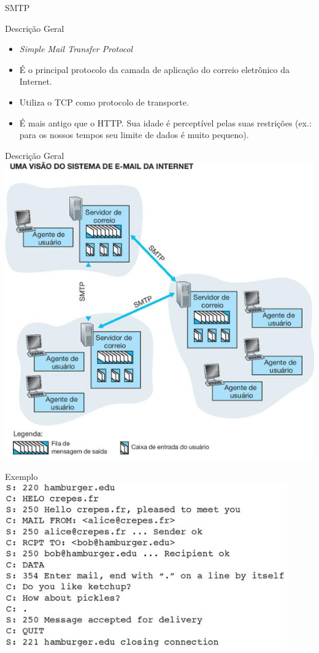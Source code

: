 \documentclass{libs/ufc_format}
\begin{document}
\begin{frame}{}
    \centering
    \Large
    SMTP
\end{frame}

\begin{frame}{Descrição Geral}
    \begin{itemize}
        \justifying
        \item \textit{Simple Mail Transfer Protocol}
        \item É o principal protocolo da camada de aplicação do correio eletrônico da Internet.
        \item Utiliza o TCP como protocolo de transporte.
        \item É mais antigo que o HTTP. Sua idade é perceptível pelas suas restrições (ex.: para os nossos tempos seu limite de dados é muito pequeno).
    \end{itemize}
\end{frame}

\begin{frame}{Descrição Geral}
    \centering
    \includegraphics[scale=0.5]{figuras/figura04_07}
\end{frame}

\begin{frame}{Exemplo}
    \includegraphics[scale=0.8]{figuras/figura04_08}
\end{frame}
\end{document}
